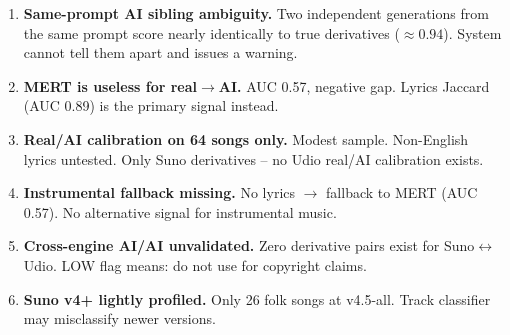 \documentclass[10pt,a4paper]{article}
\begin{document}
\begin{enumerate}[nosep, leftmargin=*]
  \item \textbf{Same-prompt AI sibling ambiguity.} Two independent
    generations from the same prompt score nearly identically to true
    derivatives ($\approx 0.94$). System cannot tell them apart and
    issues a warning.

  \item \textbf{MERT is useless for real$\to$AI.} AUC 0.57, negative gap.
    Lyrics Jaccard (AUC 0.89) is the primary signal instead.

  \item \textbf{Real/AI calibration on 64 songs only.} Modest sample.
    Non-English lyrics untested. Only Suno derivatives -- no Udio
    real/AI calibration exists.

  \item \textbf{Instrumental fallback missing.} No lyrics $\to$ fallback
    to MERT (AUC 0.57). No alternative signal for instrumental music.

  \item \textbf{Cross-engine AI/AI unvalidated.} Zero derivative pairs
    exist for Suno$\leftrightarrow$Udio. LOW flag means: do not use
    for copyright claims.

  \item \textbf{Suno v4+ lightly profiled.} Only 26 folk songs at
    v4.5-all. Track classifier may misclassify newer versions.
\end{enumerate}
\end{document}
